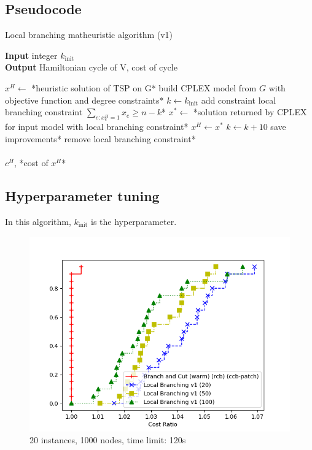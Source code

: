 \subsection{Pseudocode}
\begin{algorithm}[h]
    \caption{Local branching matheuristic algorithm (v1)}
    \textbf{Input} integer $k_{\text{init}}$\\
    \textbf{Output} Hamiltonian cycle of V, cost of cycle\\
    \begin{algorithmic}

        \State $x^H \gets$ *heuristic solution of TSP on G*
        \State *build CPLEX model from $G$ with objective function and degree constraints*
        \State $k\gets k_{\text{init}}$
        \State *add constraint local branching constraint $\sum_{e:x_e^H=1}x_e\geq n-k$*
        \State $x^*\gets$ *solution returned by CPLEX for input model with local branching constraint*
        \State $x^H\gets x^*$
        \EndIf
        \State $k\gets k+10$
        \EndIf
        \State *save improvements*
        \State *remove local branching constraint*
        \EndWhile\\\\

        \Return $c^H$, *cost of $x^H$*

    \end{algorithmic}
\end{algorithm}
\FloatBarrier

\subsection{Hyperparameter tuning}

In this algorithm, $k_{\text{init}}$ is the hyperparameter.

\begin{figure}[h]
    \centering
    \includegraphics*[width=.6\textwidth]{../plots/perfprof_lbv1_costs.png}
    \caption*{20 instances, 1000 nodes, time limit: 120s}
\end{figure}

